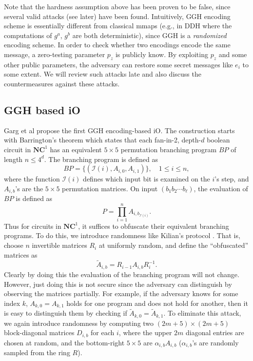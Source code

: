 \documentclass[10pt]{article}
\newcommand{\set}[1]{\mathcal{#1}}
\theoremstyle{plain}
\theoremstyle{definition}
\theoremstyle{remark}
\newcommand{\inp}{\set{I}}
\begin{document}
Note that the hardness assumption above has been proven to be false, since several valid attacks (see later) have been found. Intuitively, GGH encoding scheme is essentially different from classical mmaps (e.g., in DDH where the computations of $g^a$, $g^b$ are both deterministic), since GGH is a \emph{randomized} encoding scheme. In order to check whether two encodings encode the same message, a zero-testing parameter $p_z$ is publicly know. By exploiting $p_z$ and some other public parameters, the adversary can restore some secret messages like $e_i$ to some extent. We will review such attacks late and also discuss the countermeasures against these attacks.

\subsection{GGH based iO}
Garg et al \cite{GGH13b} propose the first GGH encoding-based iO. The construction starts with Barrington's theorem \cite{Bar86} which states that each fan-in-2, depth-$d$ boolean circuit in $\mathbf{NC}^1$ has an equivalent $5\times 5$ permutation branching program $BP$ of length $n \leq 4^d$. The branching program is defined as
$$BP = \{(\inp(i), A_{i,0}, A_{i,1})\},\quad 1\leq i \leq n,$$
where the function $\inp(i)$ defines which input bit is examined on the $i$'s step, and $A_{i,b}$'s are the $5\times 5$ permutation matrices. On input $(b_1b_2\cdots b_\ell)$, the evaluation of $BP$ is defined as
$$P = \prod_{i=1}^n A_{i,b_{\inp(i)}}.$$ 
Thus for circuits in $\mathbf{NC}^1$, it suffices to obfuscate their equivalent branching programs. To do this, we introduce randomness like Kilian's protocol \cite{Kil88}. That is, choose $n$ invertible matrices $R_i$ at uniformly random, and define the ``obfuscated'' matrices as
$$\tilde{A}_{i,b} = R_{i-1} A_{i,b} R_i^{-1}.$$
Clearly by doing this the evaluation of the branching program will not change. However, just doing this is not secure since the adversary can distinguish by observing the matrices partially. For example, if the adversary knows for some index $k$, $A_{k,0} = A_{k,1}$ holds for one program and does not hold for another, then it is easy to distinguish them by checking if $\tilde{A}_{k,0} = \tilde{A}_{k,1}$. To eliminate this attack, we again introduce randomness by computing two $(2m+5) \times (2m+5)$ block-diagonal matrices $D_{i,b}$ for each $i$, where the upper $2m$ diagonal entries are chosen at random, and the bottom-right $5\times 5$ are $\alpha_{i,b} A_{i,b}$ ($\alpha_{i,b}$'s are randomly sampled from the ring $R$).
\end{document}
